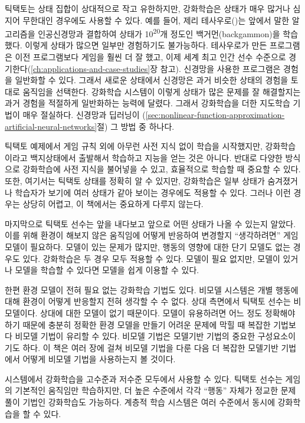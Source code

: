 틱택토는 상태 집합이 상대적으로 작고 유한하지만, 강화학습은 상태가 매우 많거나
심지어 무한대인 경우에도 사용할 수 있다. 예를 들어, 제리
테사우로(\cite{Tesauro1992, Tesauro1995})는 앞에서 말한 알고리즘을 인공신경망과
결합하여 상태가 10\textsuperscript{20}개 정도인 백거먼(backgammon)을 학습했다.
이렇게 상태가 많으면 일부만 경험하기도 불가능하다. 테사우로가 만든 프로그램은
이전 프로그램보다 게임을 훨씬 더 잘 했고, 이제 세계 최고 인간 선수 수준으로
경기한다(\ref{ch:applications-and-case-studies}장 참고). 신경망을 사용한
프로그램은 경험을 일반화할 수 있다. 그래서 새로운 상태에서 신경망은 과거 비슷한
상태의 경험을 토대로 움직임을 선택한다. 강화학습 시스템이 이렇게 상태가 많은
문제를 잘 해결할지는 과거 경험을 적절하게 일반화하는 능력에 달렸다. 그래서
강화학습을 더한 지도학습 기법이 매우 절실하다. 신경망과 딥러닝이
(\ref{sec:nonlinear-function-approximation-artificial-neural-networks}절) 그
방법 중 하나다.

틱택토 예제에서 게임 규칙 외에 아무런 사전 지식 없이 학습을 시작했지만,
강화학습이라고 백지상태에서 출발해서 학습하고 지능을 얻는 것은 아니다. 반대로
다양한 방식으로 강화학습에 사전 지식을 불어넣을 수 있고, 효율적으로 학습할 때
중요할 수 있다. 또한, 여기서는 틱택토 상태를 정확히 알 수 있지만, 강화학습은
일부 상태가 숨겨졌거나 학습자가 보기에 여러 상태가 같아 보이는 경우에도 적용할
수 있다. 그러나 이런 경우는 상당히 어렵고, 이 책에서는 중요하게 다루지 않는다.

마지막으로 틱택토 선수는 앞을 내다보고 앞으로 어떤 상태가 나올 수 있는지 알았다.
이를 위해 환경이 해보지 않은 움직임에 어떻게 반응하여 변경할지 ``생각하려면''
게임 모델이 필요하다. 모델이 있는 문제가 많지만, 행동의 영향에 대한 단기 모델도
없는 경우도 있다. 강화학습은 두 경우 모두 적용할 수 있다. 모델이 필요 없지만,
모델이 있거나 모델을 학습할 수 있다면 모델을 쉽게 이용할 수 있다.


한편 환경 모델이 전혀 필요 없는 강화학습 기법도 있다. 비모델 시스템은 개별
행동에 대해 환경이 어떻게 반응할지 전혀 생각할 수 수 없다. 상대 측면에서 틱택토
선수는 비모델이다. 상대에 대한 모델이 없기 때문이다. 모델이 유용하려면 어느 정도
정확해야 하기 때문에 충분히 정확한 환경 모델을 만들기 어려운 문제에 막힐 때
복잡한 기법보다 비모델 기법이 유리할 수 있다. 비모델 기법은 모델기반 기법의
중요한 구성요소이기도 하다. 이 책은 여러 장에 걸쳐 비모델 기법을 다룬 다음 더
복잡한 모델기반 기법에서 어떻게 비모델 기법을 사용하는지 볼 것이다.

시스템에서 강화학습을 고수준과 저수준 모두에서 사용할 수 있다. 틱택토 선수는
게임의 기본적인 움직임만 학습하지만, 더 높은 수준에서 각각 ``행동'' 자체가
정교한 문제 풀이 기법인 강화학습도 가능하다. 계층적 학습 시스템은 여러 수준에서
동시에 강화학습을 할 수 있다.

